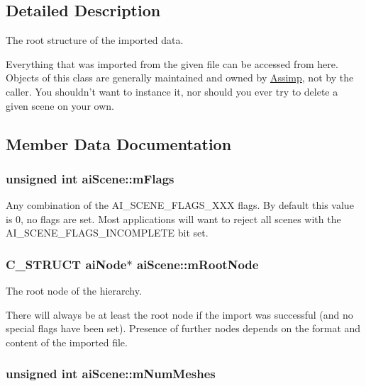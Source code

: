 \subsection{Detailed Description}
The root structure of the imported data.

Everything that was imported from the given file can be accessed from here. Objects of this class are generally maintained and owned by \hyperlink{namespace_assimp}{Assimp}, not by the caller. You shouldn't want to instance it, nor should you ever try to delete a given scene on your own. 

\subsection{Member Data Documentation}
\hypertarget{structai_scene_4091f10bb81e05db00ebc34f40c48f38}{
\subsubsection[mFlags]{\setlength{\rightskip}{0pt plus 5cm}unsigned int {\bf aiScene::mFlags}}}
\label{structai_scene_4091f10bb81e05db00ebc34f40c48f38}


Any combination of the AI\_\-SCENE\_\-FLAGS\_\-XXX flags. By default this value is 0, no flags are set. Most applications will want to reject all scenes with the AI\_\-SCENE\_\-FLAGS\_\-INCOMPLETE bit set. \hypertarget{structai_scene_d0e9a7e68f2ed6b3120a7c19ef20307a}{
\subsubsection[mRootNode]{\setlength{\rightskip}{0pt plus 5cm}C\_\-STRUCT {\bf aiNode}$\ast$ {\bf aiScene::mRootNode}}}
\label{structai_scene_d0e9a7e68f2ed6b3120a7c19ef20307a}


The root node of the hierarchy.

There will always be at least the root node if the import was successful (and no special flags have been set). Presence of further nodes depends on the format and content of the imported file. \hypertarget{structai_scene_1a6c1abca994c54381a28cc151e5fa4f}{
\subsubsection[mNumMeshes]{\setlength{\rightskip}{0pt plus 5cm}unsigned int {\bf aiScene::mNumMeshes}}}
\label{structai_scene_1a6c1abca994c54381a28cc151e5fa4f}


